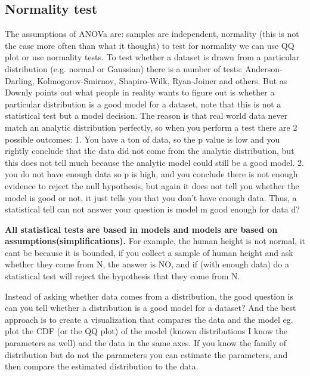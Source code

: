 \documentclass[11pt]{article}
\theoremstyle{definition}
\theoremstyle{remark}
\begin{document}
\subsection{Normality test}
\label{sse:normal}
The assumptions of ANOVa are: samples are independent, normality (this is not the case more often than what it thought) to test for normality we can use QQ plot or use normality tests. To test whether a dataset is drawn from a particular distribution (e.g. normal or Gaussian) there is a number of tests: Anderson-Darling, Kolmogorov-Smirnov, Shapiro-Wilk, Ryan-Joiner and others. 
But as Downly points out what people in reality wants to figure out is whether a particular distribution is a good model for a dataset, note that this  is not a statistical test but a model decision. The reason is that real world data never match an analytic distribution perfectly, so when you perform a test there are 2 possible outcomes:
1. You have a ton of data, so the p value is low and you rightly conclude that the data did not come from the analytic distribution, but this does not tell much because the analytic model could still be a good model. 2. you do not have enough data so p is high, and you conclude there is not enough evidence to reject the null hypothesis, but again it does not tell you whether the model is good or not, it just tells you that you don't have enough data. Thus, a statistical tell can not answer your question is model m good enough for data d?

\textbf{All statistical tests are based in models and models are based on assumptions(simplifications).}
For example, the human height is not normal, it cant be because it is bounded, if you collect a sample of human height and ask whether they come from N, the answer is NO, and if (with enough data) do a statistical test will reject the hypothesis that they come from N.

Instead of asking whether data comes from a distribution, the good question is can you tell whether a distribution is a good model for a dataset?
 And the best approach is to create a visualization that compares the data and the model eg. plot the CDF (or the QQ plot) of the model (known distributions I know the parameters as well) and the data in the same axes. If you know the family of distribution but do not the parameters you can estimate the parameters, and then compare the estimated distribution to the data.

\end{document}
